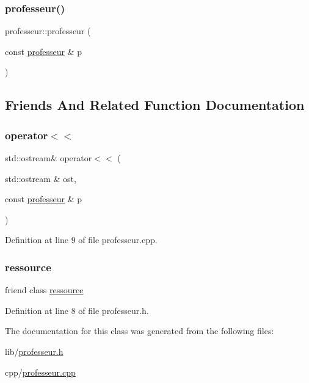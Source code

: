 \subsubsection{\texorpdfstring{professeur()}{professeur()}\hspace{0.1cm}{\footnotesize\ttfamily [2/2]}}
{\footnotesize\ttfamily professeur\+::professeur (\begin{DoxyParamCaption}\item[{const \hyperlink{classprofesseur}{professeur} \&}]{p }\end{DoxyParamCaption})\hspace{0.3cm}{\ttfamily [default]}}



\subsection{Friends And Related Function Documentation}
\hypertarget{classprofesseur_af2c9e0cbc90dfc33c6edca8c14d7f1bd}{}\label{classprofesseur_af2c9e0cbc90dfc33c6edca8c14d7f1bd} 
\subsubsection{\texorpdfstring{operator$<$$<$}{operator<<}}
{\footnotesize\ttfamily std\+::ostream\& operator$<$$<$ (\begin{DoxyParamCaption}\item[{std\+::ostream \&}]{ost,  }\item[{const \hyperlink{classprofesseur}{professeur} \&}]{p }\end{DoxyParamCaption})\hspace{0.3cm}{\ttfamily [friend]}}



Definition at line 9 of file professeur.\+cpp.

\hypertarget{classprofesseur_a24d55629351652ce27831ce9ef5194c9}{}\label{classprofesseur_a24d55629351652ce27831ce9ef5194c9} 
\subsubsection{\texorpdfstring{ressource}{ressource}}
{\footnotesize\ttfamily friend class \hyperlink{classressource}{ressource}\hspace{0.3cm}{\ttfamily [friend]}}



Definition at line 8 of file professeur.\+h.



The documentation for this class was generated from the following files\+:\begin{DoxyCompactItemize}
\item 
lib/\hyperlink{professeur_8h}{professeur.\+h}\item 
cpp/\hyperlink{professeur_8cpp}{professeur.\+cpp}\end{DoxyCompactItemize}
